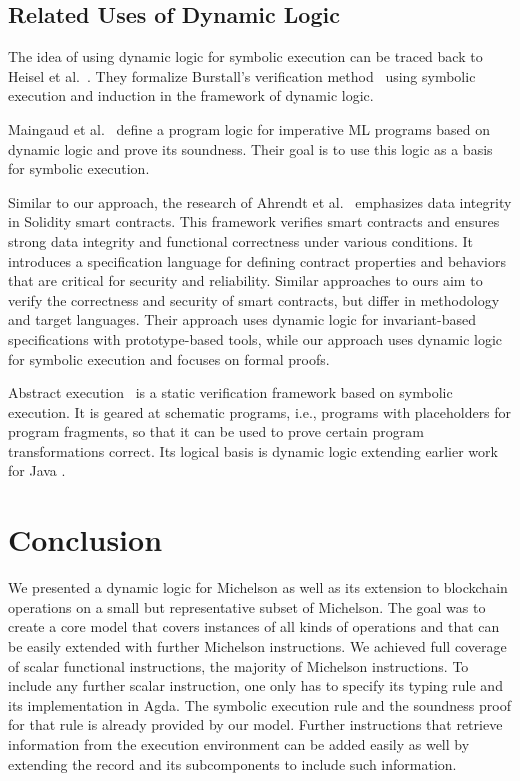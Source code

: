 \subsection{Related Uses of Dynamic Logic}
\label{sec:related-uses-dynamic}

The idea of using dynamic logic for symbolic execution can be traced
back to Heisel et al.~\cite{DBLP:conf/ki/HeiselRS87}. They formalize
Burstall's verification method~\cite{DBLP:conf/ifip/Burstall74} using
symbolic execution and induction in the framework of dynamic logic.

Maingaud et al.~\cite{DBLP:conf/foveoos/MaingaudBBHM10} define a
program logic for imperative ML programs based on dynamic logic and prove its
soundness. Their goal is to use this logic as a basis for symbolic
execution. 

Similar to our approach, the research of Ahrendt et
al.~\cite{ahrendt_et_al} emphasizes data integrity in Solidity smart
contracts. This framework verifies smart contracts and ensures strong
data integrity and functional correctness under various conditions. It
introduces a specification language for defining contract properties
and behaviors that are critical for security and reliability. Similar
approaches to ours aim to verify the correctness and security of smart
contracts, but differ in methodology and target languages. Their
approach uses dynamic logic for invariant-based specifications with
prototype-based tools, while our approach uses dynamic logic for
symbolic execution and focuses on formal proofs. 

Abstract execution~\cite{DBLP:conf/fm/SteinhofelH19} is a static
verification framework based on symbolic execution. It is geared at
schematic programs, i.e., programs with placeholders for program
fragments, so that it can be used to prove certain program
transformations correct. Its logical basis is dynamic logic 
extending earlier work for Java \cite{KeY3}.

\section{Conclusion}
\label{sec:conclusion}

We presented a dynamic logic for Michelson as well as its extension to blockchain operations
on a small but representative subset of Michelson.
The goal was to create a core model that covers instances of all kinds
of operations and that can be easily extended with further Michelson instructions.
We achieved full coverage of scalar functional instructions, the majority of Michelson
instructions.
To include any further scalar instruction,
one only has to specify its typing rule and its implementation in Agda.
The symbolic execution rule and the soundness proof for that rule is
already provided by our model.
Further instructions that retrieve information from the execution environment can be added
easily as well by extending the  record and its subcomponents
to include such information.

